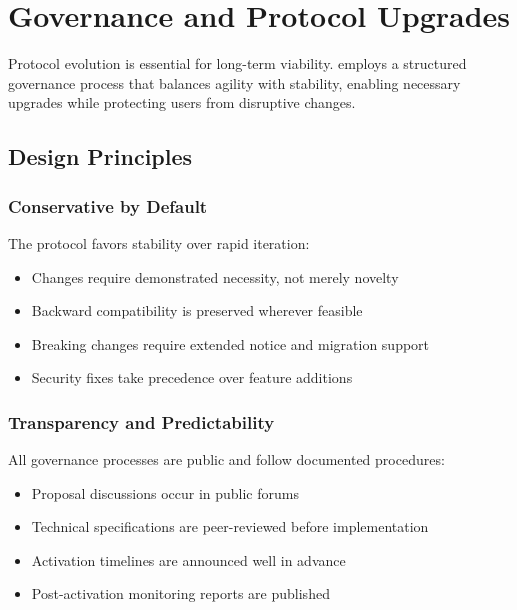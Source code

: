 
\section{Governance and Protocol Upgrades}
\label{sec:governance}

Protocol evolution is essential for long-term viability. \Botho employs
a structured governance process that balances agility with stability,
enabling necessary upgrades while protecting users from disruptive changes.

\subsection{Design Principles}

\subsubsection{Conservative by Default}

The protocol favors stability over rapid iteration:

\begin{itemize}
  \item Changes require demonstrated necessity, not merely novelty
  \item Backward compatibility is preserved wherever feasible
  \item Breaking changes require extended notice and migration support
  \item Security fixes take precedence over feature additions
\end{itemize}

\subsubsection{Transparency and Predictability}

All governance processes are public and follow documented procedures:

\begin{itemize}
  \item Proposal discussions occur in public forums
  \item Technical specifications are peer-reviewed before implementation
  \item Activation timelines are announced well in advance
  \item Post-activation monitoring reports are published
\end{itemize}


